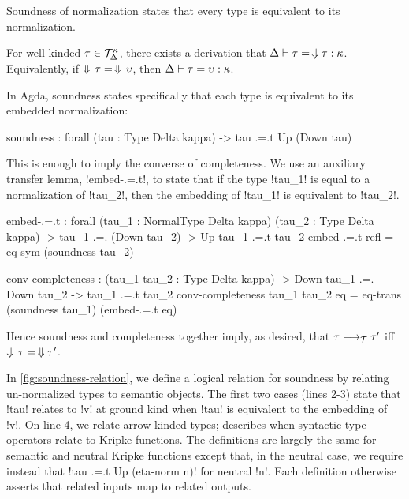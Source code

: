 \documentclass[sigplan,10pt,anonymous,review]{acmart}\settopmatter{printfolios=true,printccs=false,printacmref=false}
\begin{document}
Soundness of normalization states that every type is equivalent to its normalization.

\ifthms
\begin{theorem}[Soundness]
For well-kinded $\tau \in {\mathcal T}_{\Delta}^{\kappa}$, there exists a derivation that $\Delta \vdash \tau = \,\Downarrow \tau : \kappa$. Equivalently, if $\Downarrow\, \tau =\, \Downarrow\, \upsilon$, then $\Delta \vdash \tau = \upsilon : \kappa$.
\end{theorem}\fi

In Agda, soundness states specifically that each type is equivalent to its embedded normalization:

\begin{agda}
soundness : forall (tau : Type Delta kappa) -> tau .=.t Up (Down tau)
\end{agda}

\Ni This is enough to imply the converse of completeness. We use an auxiliary transfer lemma, !embed-.=.t!, to state that if the type !tau_1! is equal to a normalization of !tau_2!, then the embedding of !tau_1! is equivalent to !tau_2!.

\begin{agda}
embed-.=.t : forall (tau_1 : NormalType Delta kappa) (tau_2 : Type Delta kappa) -> 
             tau_1 .=. (Down tau_2) -> Up tau_1 .=.t tau_2 
embed-.=.t refl = eq-sym (soundness tau_2)

conv-completeness : (tau_1 tau_2 : Type Delta kappa) -> 
                    Down tau_1 .=. Down tau_2 -> tau_1 .=.t tau_2
conv-completeness tau_1 tau_2 eq = 
  eq-trans (soundness tau_1) (embed-.=.t eq)                 
\end{agda}

\Ni Hence soundness and completeness together imply, as desired, that $\tau \longrightarrow_{\mathcal T} \tau'$ iff $\Downarrow\, \tau =\, \Downarrow \tau'$.

In \cref{fig:soundness-relation}, we define a logical relation for soundness by relating un-normalized types to semantic objects. The first two cases (lines 2-3) state that !tau! relates to !v! at ground kind when !tau! is equivalent to the embedding of !v!. On line 4, we relate arrow-kinded types;  describes when syntactic type operators relate to Kripke functions. The definitions are largely the same for semantic and neutral Kripke functions except that, in the neutral case, we require instead that !tau .=.t Up (eta-norm n)! for neutral !n!. Each definition otherwise asserts that related inputs map to related outputs.
\end{document}
